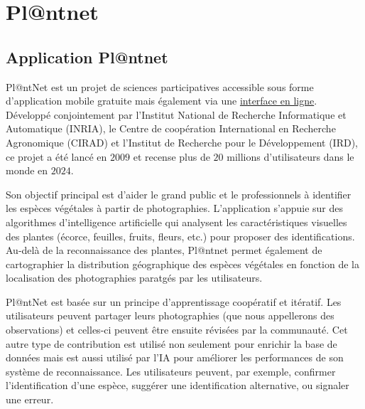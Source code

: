 \documentclass[a4paper,12pt]{article}
\begin{document}
\section{Pl@ntnet}


\subsection{Application Pl@ntnet}

Pl@ntNet est un projet de sciences participatives accessible sous forme d’application mobile gratuite mais également via une \href{https://identify.plantnet.org/fr}{interface en ligne}. Développé conjointement par l'Institut National de Recherche Informatique et Automatique (INRIA), le Centre de coopération International en Recherche Agronomique (CIRAD) et l'Institut de Recherche pour le Développement (IRD), ce projet a été lancé en $2009$ et recense plus de $20$ millions d'utilisateurs dans le monde en $2024$. 

\vspace{0.2cm}

Son objectif principal est d'aider le grand public et le professionnels à identifier les espèces végétales à partir de photographies. L'application s'appuie sur des algorithmes d'intelligence artificielle qui analysent les caractéristiques visuelles des plantes (écorce, feuilles, fruits, fleurs, etc.) pour proposer des identifications. Au-delà de la reconnaissance des plantes, Pl@ntnet permet également de cartographier la distribution géographique des espèces végétales en fonction de la localisation des photographies paratgés par les utilisateurs.

\vspace{0.2cm}

Pl@ntNet est basée sur un principe d’apprentissage coopératif et itératif. Les utilisateurs peuvent partager leurs photographies (que nous appellerons des observations) et celles-ci peuvent être ensuite révisées par la communauté. Cet autre type de contribution est utilisé non seulement pour enrichir la base de données mais est aussi utilisé par l’IA pour améliorer les performances de son système de reconnaissance. Les utilisateurs peuvent, par exemple, confirmer l'identification d'une espèce, suggérer une identification alternative, ou signaler une erreur.

\vspace{0.2cm}
\end{document}
